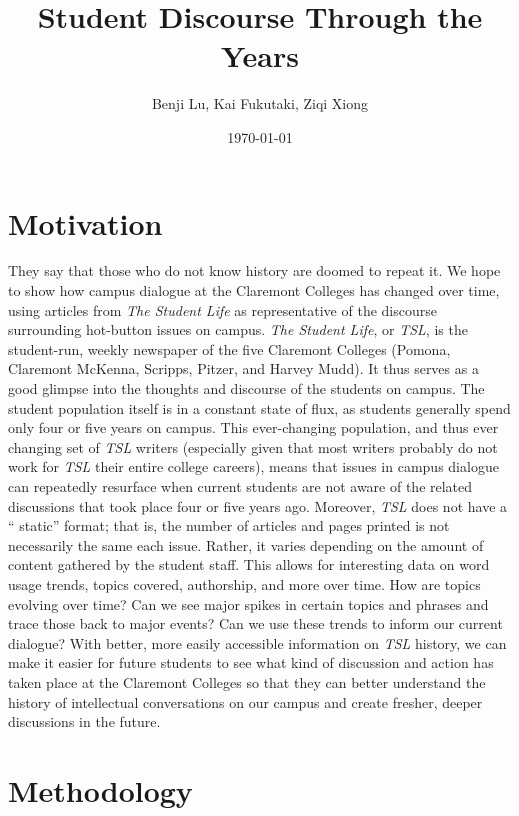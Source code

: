 \documentclass[a4paper]{article}
\title{Student Discourse Through the Years}
\author{Benji Lu, Kai Fukutaki, Ziqi Xiong}
\date{\today}
\begin{document}
\maketitle





\section{Motivation}
They say that those who do not know history are doomed to repeat it. We hope to show how campus dialogue at the Claremont Colleges has changed over time, using articles from \textit{The Student Life} as representative of the discourse surrounding hot-button issues on campus. \textit{The Student Life}, or \textit{TSL}, is the student-run, weekly newspaper of the five Claremont Colleges (Pomona, Claremont McKenna, Scripps, Pitzer, and Harvey Mudd). It thus serves as a good glimpse into the thoughts and discourse of the students on campus. The student population itself is in a constant state of flux, as students generally spend only four or five years on campus. This ever-changing population, and thus ever changing set of \textit{TSL} writers (especially given that most writers probably do not work for \textit{TSL} their entire college careers), means that issues in campus dialogue can repeatedly resurface when current students are not aware of the related discussions that took place four or five years ago. Moreover, \textit{TSL} does not have a `` static''  format; that is, the number of articles and pages printed is not necessarily the same each issue. Rather, it varies depending on the amount of content gathered by the student staff. This allows for interesting data on word usage trends, topics covered, authorship, and more over time. How are topics evolving over time? Can we see major spikes in certain topics and phrases and trace those back to major events? Can we use these trends to inform our current dialogue? With better, more easily accessible information on \textit{TSL} history, we can make it easier for future students to see what kind of discussion and action has taken place at the Claremont Colleges so that they can better understand the history of intellectual conversations on our campus and create fresher, deeper discussions in the future.

\section{Methodology}
\end{document}

